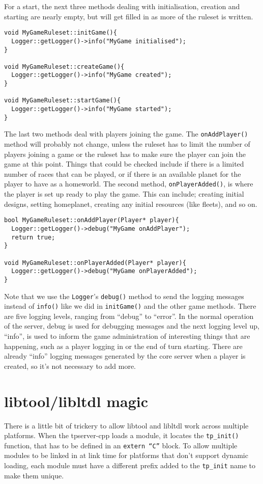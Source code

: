 \documentclass[a4paper,11pt]{report}
\newcommand{\codename}[1]{\texttt{#1}}
\begin{document}
For a start, the next three methods dealing with initialisation, creation and starting are nearly empty, but will get filled in as more of the ruleset is written.

\begin{verbatim}
void MyGameRuleset::initGame(){
  Logger::getLogger()->info("MyGame initialised");
}

void MyGameRuleset::createGame(){
  Logger::getLogger()->info("MyGame created");
}

void MyGameRuleset::startGame(){
  Logger::getLogger()->info("MyGame started");
}
\end{verbatim}

The last two methods deal with players joining the game. The \codename{onAddPlayer()} method will probably not change, unless the ruleset has to limit the number of players joining a game or the ruleset has to make sure the player can join the game at this point. Things that could be checked include if there is a limited number of races that can be played, or if there is an available planet for the player to have as a homeworld. The second method, \codename{onPlayerAdded()}, is where the player is set up ready to play the game. This can include; creating initial designs, setting homeplanet, creating any initial resources (like fleets), and so on.

\begin{verbatim}
bool MyGameRuleset::onAddPlayer(Player* player){
  Logger::getLogger()->debug("MyGame onAddPlayer");
  return true;
}

void MyGameRuleset::onPlayerAdded(Player* player){
  Logger::getLogger()->debug("MyGame onPlayerAdded");
}
\end{verbatim}

Note that we use the \codename{Logger}'s \codename{debug()} method to send the logging messages instead of \codename{info()} like we did in \codename{initGame()} and the other game methods. There are five logging levels, ranging from ``debug'' to ``error''. In the normal operation of the server, debug is used for debugging messages and the next logging level up, ``info'', is used to inform the game administration of interesting things that are happening, such as a player logging in or the end of turn starting. There are already ``info'' logging messages generated by the core server when a player is created, so it's not necessary to add more.


\section{libtool/libltdl magic}
There is a little bit of trickery to allow libtool and libltdl work across multiple platforms. When the tpserver-cpp loads a module, it locates the \codename{tp\_init()} function, that has to be defined in an \codename{extern ``C''} block. To allow multiple modules to be linked in at link time for platforms that don't support dynamic loading, each module must have a different prefix added to the \codename{tp\_init} name to make them unique.
\end{document}
